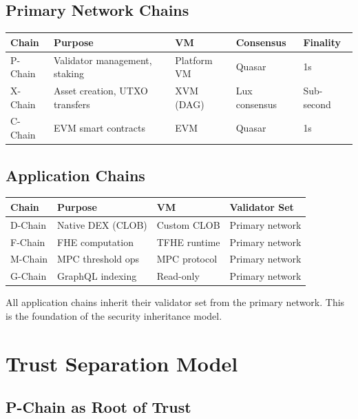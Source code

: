 \documentclass[11pt,a4paper]{article}
\begin{document}
\subsection{Primary Network Chains}

\begin{center}
\begin{tabular}{lllll}
\toprule
\textbf{Chain} & \textbf{Purpose} & \textbf{VM} & \textbf{Consensus} & \textbf{Finality} \\
\midrule
P-Chain & Validator management, staking & Platform VM & Quasar & 1s \\
X-Chain & Asset creation, UTXO transfers & XVM (DAG) & Lux consensus & Sub-second \\
C-Chain & EVM smart contracts & EVM & Quasar & 1s \\
\bottomrule
\end{tabular}
\end{center}

\subsection{Application Chains}

\begin{center}
\begin{tabular}{llll}
\toprule
\textbf{Chain} & \textbf{Purpose} & \textbf{VM} & \textbf{Validator Set} \\
\midrule
D-Chain & Native DEX (CLOB) & Custom CLOB & Primary network \\
F-Chain & FHE computation & TFHE runtime & Primary network \\
M-Chain & MPC threshold ops & MPC protocol & Primary network \\
G-Chain & GraphQL indexing & Read-only & Primary network \\
\bottomrule
\end{tabular}
\end{center}

All application chains inherit their validator set from the primary network. This is the foundation of the security inheritance model.

\section{Trust Separation Model}

\subsection{P-Chain as Root of Trust}
\end{document}
